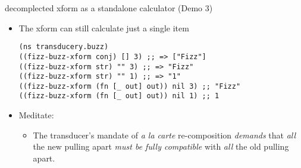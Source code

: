 \documentclass[presentation]{beamer}
\begin{document}
\begin{frame}[label={sec:org5aad46d},fragile]{decomplected xform as a standalone calculator (Demo 3)}
 \begin{itemize}
\item The xform can still calculate just a single item
\begin{verbatim}
(ns transducery.buzz)
((fizz-buzz-xform conj) [] 3) ;; => ["Fizz"]
((fizz-buzz-xform str) "" 3) ;; => "Fizz"
((fizz-buzz-xform str) "" 1) ;; => "1"
((fizz-buzz-xform (fn [_ out] out)) nil 3) ;; "Fizz"
((fizz-buzz-xform (fn [_ out] out)) nil 1) ;; 1
\end{verbatim}
\item Meditate:
\begin{itemize}
\item The transducer's mandate of \emph{a la carte} re-composition \emph{demands}
that \emph{all} the new pulling apart \emph{must be fully compatible}
with \emph{all} the old pulling apart.
\end{itemize}
\end{itemize}
\end{frame}
\end{document}
